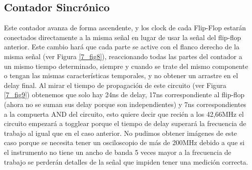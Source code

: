  



\subsection*{Contador Sincrónico}

Este contador avanza de forma ascendente, y los clock de cada Flip-Flop estarán conectados directamente a la misma señal en lugar de usar la señal del flip-flop anterior. Este cambio hará que cada parte se active con el flanco derecho de la misma señal (ver Figura \ref{7_fig8}), reaccionando todas las partes del contador a un mismo tiempo determinado, siempre y cuando se trate del mismo componente o tengan las mismas características temporales, y no obtener un arrastre en el delay final.
\newline
Al mirar el tiempo de propagación de este circuito (ver Figura \ref{7_fig9}) obtenemos que solo hay 24ns de delay, 17ns correspondiente al flip-flop (ahora no se suman sus delay porque son independientes) y 7ns correspondientes a la compuerta AND del circuito, esto quiere decir que recién a los 42,66MHz el circuito empezará a togglear porque el tiempo de delay superará la frecuencia de trabajo al igual que en el caso anterior. No pudimos obtener imágenes de este caso porque se necesita tener un osciloscopio de más de 200MHz debido a que si el instrumento no tiene un ancho de banda 5 veces mayor a la frecuencia de trabajo se perderán detalles de la señal que impiden tener una medición correcta.

